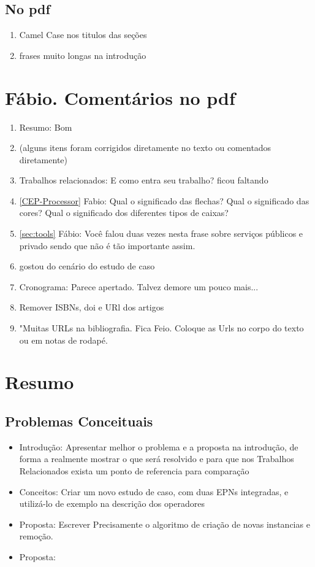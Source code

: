 \subsection{No pdf}
\begin{enumerate}
\item Camel Case nos titulos das seções
\item frases muito longas na introdução
\end{enumerate}

\section{Fábio. Comentários no pdf}

\begin{enumerate}
\item Resumo: Bom
\item (alguns itens foram corrigidos diretamente no texto ou comentados diretamente)
\item Trabalhos relacionados: E como entra seu trabalho? ficou faltando
\item \ref{CEP-Processor} Fabio: Qual o significado das flechas? Qual o significado das cores? Qual o significado dos diferentes tipos de caixas?

\item \ref{sec:tools} Fábio: Você falou duas vezes nesta frase sobre serviços públicos e privado sendo que não é tão importante assim.
\item gostou do cenário do estudo de caso
\item Cronograma: Parece apertado. Talvez demore um pouco mais...
\item Remover ISBNs, doi e URl dos artigos
\item "Muitas URLs na bibliografia. Fica Feio. Coloque as Urls no corpo do texto ou em notas de rodapé.
\end{enumerate}

\section{Resumo}

\subsection{Problemas Conceituais}

\begin{itemize}
\item Introdução: Apresentar melhor o problema e a proposta na introdução, de forma a realmente mostrar o que será resolvido e para que nos Trabalhos Relacionados exista um ponto de referencia para comparação
\item Conceitos: Criar um novo estudo de caso, com duas EPNs integradas, e utilizá-lo de exemplo na descrição dos operadores
\item Proposta: Escrever Precisamente o algoritmo de criação de novas instancias e remoção.
\item Proposta: 
\end{itemize}




